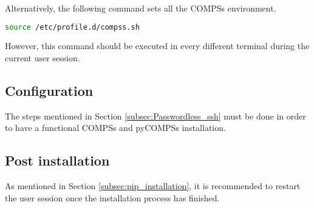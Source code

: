 Alternatively, the following command sets all the COMPSs environment.
\begin{lstlisting}[language=bash]
source /etc/profile.d/compss.sh
\end{lstlisting}
However, this command should be executed in every different terminal during the current user session.


\subsection{Configuration}
\label{subsec:pip_configuration}
The steps mentioned in Section \ref{subsec:Passwordless_ssh} must be done in order to have a functional COMPSs and pyCOMPSs installation.


\subsection{Post installation}
As mentioned in Section \ref{subsec:pip_installation}, it is recommended to restart the user session once the installation process has finished.
